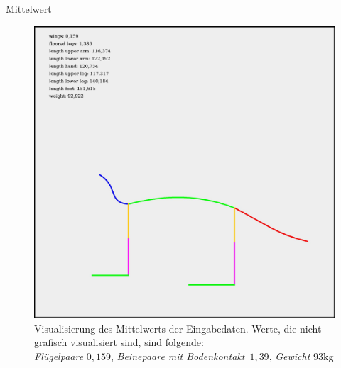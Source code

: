 \documentclass{beamer}
\begin{document}
\begin{frame}{Mittelwert}
 \begin{figure}
  \centering
  \includegraphics[height=0.6\textheight]{../../PCA/mean_log_weight_downscaled_wings_legs_and_weight(onlyBox,stroke4).jpg}
  \caption{Visualisierung des Mittelwerts der Eingabedaten. Werte, die nicht grafisch visualisiert sind, sind folgende:\\\emph{Flügelpaare} $0{,}159$, \emph{Beinepaare mit Bodenkontakt}~$1{,}39$, \emph{Gewicht} $93$kg}
 \end{figure}
\end{frame}
\end{document}
